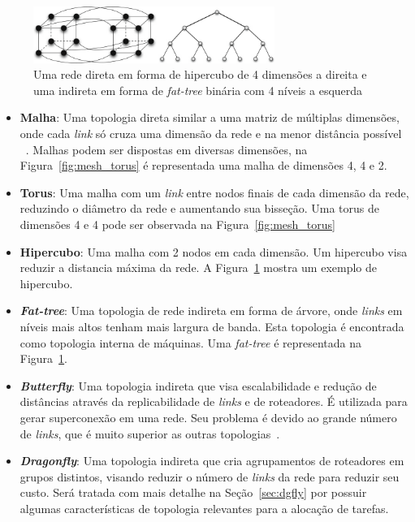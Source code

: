 \documentclass[
	12pt,				%
	openright,			%
	twoside,			%
	a4paper,			%
	english,			%
	brazil,				%
	]{abntex2}
\newcommand{\links}{\textit{links}\xspace}
\newcommand{\link}{\textit{link}\xspace}
\newcommand{\fatt}{\textit{fat-tree}\xspace}
\newcommand{\Fatt}{\textit{Fat-tree}\xspace}
\newcommand{\Dgfly}{\textit{Dragonfly}\xspace}
\begin{document}
\begin{figure} [t]
    \includegraphics[width=0.7\textwidth]{hypercube_fat_tree}
    \centering
    \caption[Um hipercubo de e uma \fatt]{Uma rede direta em forma de hipercubo de 4 dimensões a direita e uma indireta em forma de \fatt binária com 4 níveis a esquerda~\cite{bhatele-encyclopedia}}
    \label{fig:cube_fat}
\end{figure}

\begin{itemize}
    \item \textbf{Malha}: Uma topologia direta similar a uma matriz de múltiplas dimensões, onde cada \link só cruza uma dimensão da rede e na menor distância possível ~\cite{Solihin}.
    Malhas podem ser dispostas em diversas dimensões, na Figura~\ref{fig:mesh_torus} é representada uma malha de dimensões 4, 4 e 2.
    
    \item \textbf{Torus}: Uma malha com um \link entre nodos finais de cada dimensão da rede, reduzindo o diâmetro da rede e aumentando sua bisseção. 
    Uma torus de dimensões 4 e 4 pode ser observada na Figura~\ref{fig:mesh_torus}
    
    \item \textbf{Hipercubo}: Uma malha com 2 nodos em cada dimensão.
    Um hipercubo visa reduzir a distancia máxima da rede. 
    A Figura~\ref{fig:cube_fat} mostra um exemplo de hipercubo.
    
    \item \textbf{\Fatt}: Uma topologia de rede indireta em forma de árvore, onde \links em níveis mais altos tenham mais largura de banda. 
    Esta topologia é encontrada como topologia interna de máquinas. 
    Uma \fatt é representada na Figura~\ref{fig:cube_fat}.
    
    \item \textbf{\textit{Butterfly}}: Uma topologia indireta que visa escalabilidade e redução de distâncias através da replicabilidade de \links e de roteadores.
    É utilizada para gerar superconexão em uma rede.
    Seu problema é devido ao grande número de \links, que é muito superior as outras topologias~\cite{david:paralel}.
    
    \item \textbf{\Dgfly}: Uma topologia indireta que cria agrupamentos de roteadores em grupos distintos, visando reduzir o número de \links da rede para reduzir seu custo.
    Será tratada com mais detalhe na Seção~\ref{sec:dgfly} por possuir algumas características de topologia relevantes para a alocação de tarefas.
\end{itemize}
\end{document}
